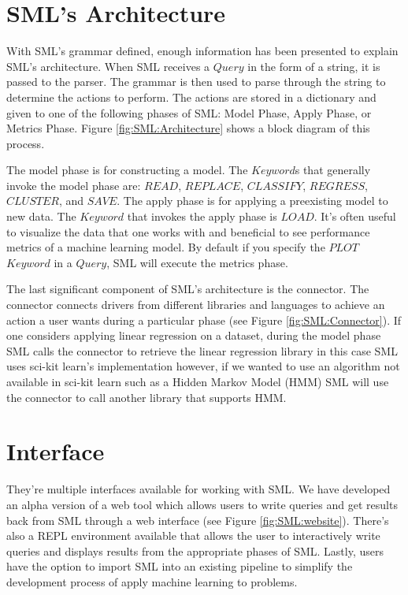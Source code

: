 \section{SML's Architecture}
\label{sml-architecture}

With SML's grammar defined, enough information has been presented to explain SML's architecture.  When SML receives a \(Query\) in the form of a string, it is passed to the parser. The grammar is then used to parse through the string to determine the actions to perform.  The actions are stored in a dictionary and given to one of the following phases of SML: Model Phase, Apply Phase, or Metrics Phase. Figure \ref{fig:SML:Architecture} shows a block diagram of this process.

The model phase is for constructing a model. The \(Keyword\)s that generally invoke the model phase are: \(READ\), \(REPLACE\), \(CLASSIFY\), \(REGRESS\), \(CLUSTER\), and \(SAVE\). The apply phase is  for applying a preexisting model  to new data. The \(Keyword\) that  invokes the apply phase is \(LOAD\). It's often useful to visualize the data that one works with and beneficial to see performance metrics of a machine learning model. By default if you specify the \(PLOT\) \(Keyword\) in a \(Query\), SML will execute the metrics phase.

The last significant component of SML's architecture is the connector. The connector connects drivers from different libraries and languages to achieve an action a user wants during a particular phase (see Figure \ref{fig:SML:Connector}). If one considers applying linear regression on a dataset, during the model phase SML calls the connector to retrieve the linear regression library in this case SML uses sci-kit learn's implementation however, if we wanted to use an algorithm not available in sci-kit learn such as a Hidden Markov Model (HMM) SML will use the connector to call another library that supports HMM.

\section{Interface}
\label{interface}

They're multiple interfaces available for working with SML. We have developed an alpha version of a web tool  which allows users to write queries and get results back from SML through a web interface (see Figure \ref{fig:SML:website}). There's also a REPL environment available that allows the user to interactively write queries and displays results from the appropriate phases of SML.  Lastly,  users have the option to import SML into an existing pipeline to simplify the development process of apply machine learning to problems.

